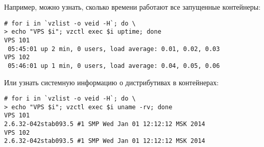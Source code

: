 Например, можно узнать, сколько времени работают все запущенные контейнеры:
\begin{lstlisting}
# for i in `vzlist -o veid -H`; do \
> echo "VPS $i"; vzctl exec $i uptime; done
VPS 101
 05:45:01 up 2 min, 0 users, load average: 0.01, 0.02, 0.03
VPS 102
 05:46:01 up 1 min, 0 users, load average: 0.04, 0.05, 0.06
\end{lstlisting}

Или узнать системную информацию о дистрибутивах в контейнерах:
\begin{lstlisting}
# for i in `vzlist -o veid -H`; do \
> echo "VPS $i"; vzctl exec $i uname -rv; done
VPS 101
2.6.32-042stab093.5 #1 SMP Wed Jan 01 12:12:12 MSK 2014
VPS 102
2.6.32-042stab093.5 #1 SMP Wed Jan 01 12:12:12 MSK 2014
\end{lstlisting}

\clearpage
